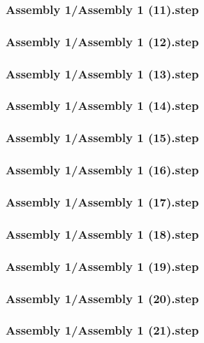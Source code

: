 \documentclass[a4paper,12pt]{article}
\begin{document}
\begin{lstlising}[language=C++]
\subsubsection{Assembly 1/Assembly 1 (11).step}

\subsubsection{Assembly 1/Assembly 1 (12).step}

\subsubsection{Assembly 1/Assembly 1 (13).step}

\subsubsection{Assembly 1/Assembly 1 (14).step}

\subsubsection{Assembly 1/Assembly 1 (15).step}

\subsubsection{Assembly 1/Assembly 1 (16).step}

\subsubsection{Assembly 1/Assembly 1 (17).step}

\subsubsection{Assembly 1/Assembly 1 (18).step}

\subsubsection{Assembly 1/Assembly 1 (19).step}

\subsubsection{Assembly 1/Assembly 1 (20).step}

\subsubsection{Assembly 1/Assembly 1 (21).step}


\end{lstlising}
\end{document}
